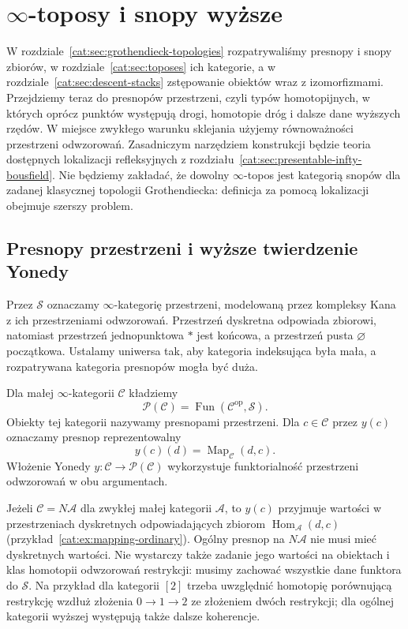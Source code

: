 \section{\texorpdfstring{$\infty$-toposy}{Toposy wyższe} i snopy wyższe}\label{cat:sec:infty-topoi}

W rozdziale~\ref{cat:sec:grothendieck-topologies} rozpatrywaliśmy presnopy i snopy zbiorów, w rozdziale~\ref{cat:sec:toposes} ich kategorie, a w rozdziale~\ref{cat:sec:descent-stacks} zstępowanie obiektów wraz z izomorfizmami. Przejdziemy teraz do presnopów przestrzeni, czyli typów homotopijnych, w których oprócz punktów występują drogi, homotopie dróg i dalsze dane wyższych rzędów. W miejsce zwykłego warunku sklejania użyjemy równoważności przestrzeni odwzorowań. Zasadniczym narzędziem konstrukcji będzie teoria dostępnych lokalizacji refleksyjnych z rozdziału~\ref{cat:sec:presentable-infty-bousfield}. Nie będziemy zakładać, że dowolny $\infty$-topos jest kategorią snopów dla zadanej klasycznej topologii Grothendiecka: definicja za pomocą lokalizacji obejmuje szerszy problem.

\subsection{Presnopy przestrzeni i wyższe twierdzenie Yonedy}

Przez $\mathcal S$ oznaczamy $\infty$-kategorię przestrzeni, modelowaną przez kompleksy Kana z ich przestrzeniami odwzorowań. Przestrzeń dyskretna odpowiada zbiorowi, natomiast przestrzeń jednopunktowa $*$ jest końcowa, a przestrzeń pusta $\varnothing$ początkowa. Ustalamy uniwersa tak, aby kategoria indeksująca była mała, a rozpatrywana kategoria presnopów mogła być duża.

\begin{definicja}\label{cat:def:infty-presheaf}
Dla małej $\infty$-kategorii $\mathcal C$ kładziemy
\[
 \mathcal P(\mathcal C)=\operatorname{Fun}(\mathcal C^{\mathrm{op}},\mathcal S).
\]
Obiekty tej kategorii nazywamy presnopami przestrzeni. Dla $c\in\mathcal C$ przez $y(c)$ oznaczamy presnop reprezentowalny
\[
 y(c)(d)=\operatorname{Map}_{\mathcal C}(d,c).
\]
Włożenie Yonedy $y:\mathcal C\to\mathcal P(\mathcal C)$ wykorzystuje funktorialność przestrzeni odwzorowań w obu argumentach.
\end{definicja}

Jeżeli $\mathcal C=N\mathcal A$ dla zwykłej małej kategorii $\mathcal A$, to $y(c)$ przyjmuje wartości w przestrzeniach dyskretnych odpowiadających zbiorom $\operatorname{Hom}_{\mathcal A}(d,c)$ (przykład~\ref{cat:ex:mapping-ordinary}). Ogólny presnop na $N\mathcal A$ nie musi mieć dyskretnych wartości. Nie wystarczy także zadanie jego wartości na obiektach i klas homotopii odwzorowań restrykcji: musimy zachować wszystkie dane funktora do $\mathcal S$. Na przykład dla kategorii $[2]$ trzeba uwzględnić homotopię porównującą restrykcję wzdłuż złożenia $0\to1\to2$ ze złożeniem dwóch restrykcji; dla ogólnej kategorii wyższej występują także dalsze koherencje.

